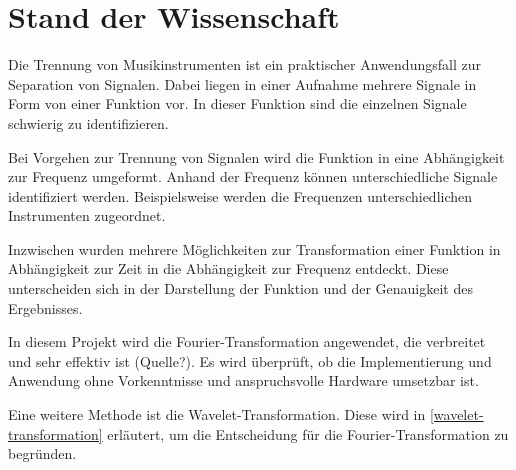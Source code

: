 \chapter{Stand der Wissenschaft}
\label{stand_der_wissenschaft}

Die Trennung von Musikinstrumenten ist ein praktischer Anwendungsfall zur Separation von Signalen. Dabei liegen in einer Aufnahme mehrere Signale in Form von einer Funktion vor. In dieser Funktion sind die einzelnen Signale schwierig zu identifizieren.

\par

Bei Vorgehen zur Trennung von Signalen wird die Funktion in eine Abhängigkeit zur Frequenz umgeformt. Anhand der Frequenz können unterschiedliche Signale identifiziert werden. Beispielsweise werden die Frequenzen unterschiedlichen Instrumenten zugeordnet.

\par

Inzwischen wurden mehrere Möglichkeiten zur Transformation einer Funktion in Abhängigkeit zur Zeit in die Abhängigkeit zur Frequenz entdeckt. Diese unterscheiden sich in der Darstellung der Funktion und der Genauigkeit des Ergebnisses.

\par

In diesem Projekt wird die Fourier-Transformation angewendet, die verbreitet und sehr effektiv ist (Quelle?). Es wird überprüft, ob die Implementierung und Anwendung ohne Vorkenntnisse und anspruchsvolle Hardware umsetzbar ist.

\par

Eine weitere Methode ist die Wavelet-Transformation. Diese wird in \cref{wavelet-transformation} erläutert, um die Entscheidung für die Fourier-Transformation zu begründen.



